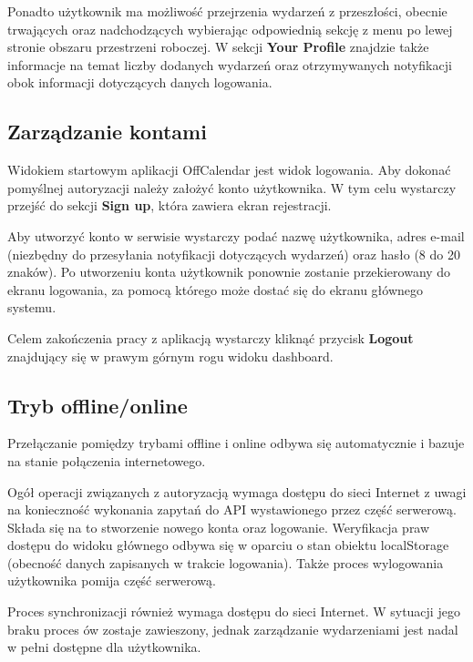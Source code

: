 Ponadto użytkownik ma możliwość przejrzenia wydarzeń z przeszłości, obecnie trwających oraz nadchodzących wybierając odpowiednią sekcję z menu po lewej stronie obszaru przestrzeni roboczej. W sekcji \textbf{Your Profile} znajdzie także informacje na temat liczby dodanych wydarzeń oraz otrzymywanych notyfikacji obok informacji dotyczących danych logowania.

\subsection{Zarządzanie kontami}
\label{sec:zarzKont}

Widokiem startowym aplikacji OffCalendar jest widok logowania. Aby dokonać pomyślnej autoryzacji należy założyć konto użytkownika. W tym celu wystarczy przejść do sekcji \textbf{Sign up}, która zawiera ekran rejestracji.

Aby utworzyć konto w serwisie wystarczy podać nazwę użytkownika, adres e-mail (niezbędny do przesyłania notyfikacji dotyczących wydarzeń) oraz hasło (8 do 20 znaków). Po utworzeniu konta użytkownik ponownie zostanie przekierowany do ekranu logowania, za pomocą którego może dostać się do ekranu głównego systemu.

Celem zakończenia pracy z aplikacją wystarczy kliknąć przycisk \textbf{Logout} znajdujący się w prawym górnym rogu widoku dashboard.

\subsection{Tryb offline/online}
\label{sec:instrTrybOffOn}

Przełączanie pomiędzy trybami offline i online odbywa się automatycznie i bazuje na stanie połączenia internetowego. 

Ogół operacji związanych z autoryzacją wymaga dostępu do sieci Internet z uwagi na konieczność wykonania zapytań do API wystawionego przez część serwerową. Składa się na to stworzenie nowego konta oraz logowanie. Weryfikacja praw dostępu do widoku głównego odbywa się w oparciu o stan obiektu localStorage (obecność danych zapisanych w trakcie logowania). Także proces wylogowania użytkownika pomija część serwerową.

Proces synchronizacji również wymaga dostępu do sieci Internet. W sytuacji jego braku proces ów zostaje zawieszony, jednak zarządzanie wydarzeniami jest nadal w pełni dostępne dla użytkownika.